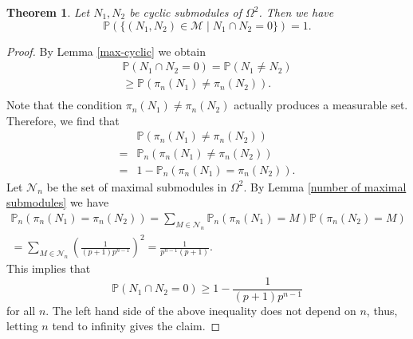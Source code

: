 \documentclass[12pt]{amsart}
\newtheorem{theorem}{Theorem}[section]
\newcommand{\Prob}{\mathbb{P}}
\numberwithin{equation}{section}
\begin{document}
\begin{theorem}
\label{thm:probability}
    Let $N_1,N_2$ be cyclic submodules of $\Omega^2$. Then we have
    \[\Prob(\{(N_1, N_2)\in \mathcal{M}\mid N_1\cap N_2=0\})=1.\]
\end{theorem}
\begin{proof}
By Lemma \ref{max-cyclic} we obtain 
    \begin{align*}
        \Prob(N_1\cap N_2=0)=\Prob(N_1\neq N_2)\\
        \ge \Prob(\pi_{n}(N_1)\neq \pi_n(N_2)).\\
    \end{align*}
    Note that the condition $\pi_n(N_1)\neq \pi_n(N_2)$ actually produces a measurable set. Therefore, we find that 
    \[\begin{split} & \Prob(\pi_{n}(N_1)\neq \pi_n(N_2)) \\
    = & \Prob_n(\pi_{n}(N_1)\neq \pi_n(N_2)) \\
    = &1-\Prob_n(\pi_{n}(N_1)= \pi_n(N_2)).\end{split}\]
    Let $\mathcal{N}_n$ be the set of maximal submodules in $\Omega^2$. 
     By Lemma \ref{number of maximal submodules} we have
    \begin{align*}\Prob_n(\pi_{n}(N_1)=\pi_n(N_2))=\sum_{M\in \mathcal{N}_n}\Prob_n(\pi_n(N_1)=M)\Prob(\pi_n(N_2)=M)\\=\sum_{M\in \mathcal{N}_n}\left(\frac{1}{(p+1)p^{n-1}}\right)^2=\frac{1}{p^{n-1}(p+1)} .\end{align*}
    This implies that 
    \[\Prob(N_1\cap N_2=0)\ge 1-\frac{1}{(p+1)p^{n-1}}\]
    for all $n$. The left hand side of the above inequality does not depend on $n$, thus, letting $n$ tend to infinity gives the claim.

\end{proof}
\end{document}

